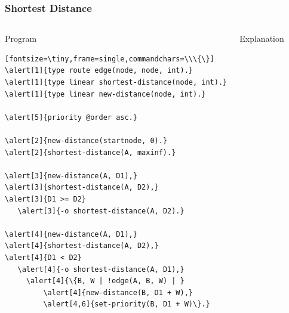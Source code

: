 \documentclass{beamer}
\let\oldalert\alert
\renewcommand{\alert}[2][]{%
  \if\relax\detokenize{#1}\relax%
    \oldalert{#2}%
  \else
    \oldalert<#1>{#2}%
  \fi}
\begin{document}
\begin{frame}[fragile]
   \frametitle{Shortest Distance}
   \begin{columns}[t]
       \begin{block}{Program}
         \begin{verbatim}[fontsize=\tiny,frame=single,commandchars=\\\{\}]
\alert[1]{type route edge(node, node, int).}
\alert[1]{type linear shortest-distance(node, int).}
\alert[1]{type linear new-distance(node, int).}

\alert[5]{priority @order asc.}

\alert[2]{new-distance(startnode, 0).}
\alert[2]{shortest-distance(A, maxinf).}

\alert[3]{new-distance(A, D1),}
\alert[3]{shortest-distance(A, D2),}
\alert[3]{D1 >= D2}
   \alert[3]{-o shortest-distance(A, D2).}

\alert[4]{new-distance(A, D1),}
\alert[4]{shortest-distance(A, D2),}
\alert[4]{D1 < D2}
   \alert[4]{-o shortest-distance(A, D1),}
     \alert[4]{\{B, W | !edge(A, B, W) | }
         \alert[4]{new-distance(B, D1 + W),}
         \alert[4,6]{set-priority(B, D1 + W)\}.}
         \end{verbatim}
      \end{block}
      \begin{block}{Explanation}
         {\small
         \begin{itemize}
         \end{itemize}
         }
      \end{block}
   \end{columns}
\end{frame}
\end{document}
